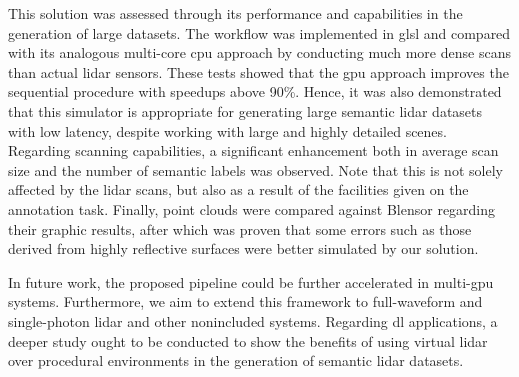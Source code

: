 This solution was assessed through its performance and capabilities in the generation of large datasets. The workflow was implemented in \acrshort{glsl} and compared with its analogous multi-core \acrshort{cpu} approach by conducting much more dense scans than actual \acrshort{lidar} sensors. These tests showed that the \acrshort{gpu} approach improves the sequential procedure with speedups above 90\%. Hence, it was also demonstrated that this simulator is appropriate for generating large semantic \acrshort{lidar} datasets with low latency, despite working with large and highly detailed scenes. Regarding scanning capabilities, a significant enhancement both in average scan size and the number of semantic labels was observed. Note that this is not solely affected by the \acrshort{lidar} scans, but also as a result of the facilities given on the annotation task. Finally, point clouds were compared against Blensor regarding their graphic results, after which was proven that some errors such as those derived from highly reflective surfaces were better simulated by our solution. 

In future work, the proposed pipeline could be further accelerated in multi-\acrshort{gpu} systems. Furthermore, we aim to extend this framework to full-waveform and single-photon \acrshort{lidar} \cite{tachella_real-time_2019} and other nonincluded systems. Regarding \acrshort{dl} applications, a deeper study ought to be conducted to show the benefits of using virtual \acrshort{lidar} over procedural environments in the generation of semantic \acrshort{lidar} datasets.
